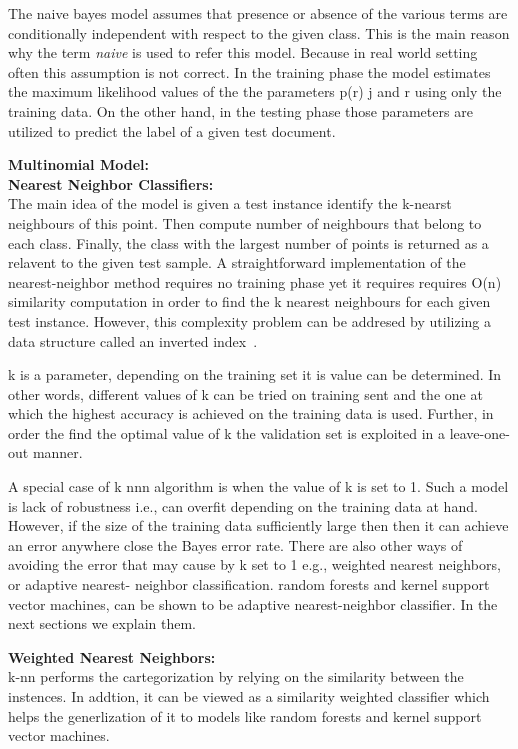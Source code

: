 The naive bayes model assumes that presence or absence of the various terms are conditionally independent with respect to the given class. This is the main reason why the term \textit{naive} is used to refer this model. Because in real world setting often this assumption is not correct. 
In the training phase the model estimates the maximum likelihood values of the the parameters p(r)
j and r using only the training data. On the other hand, in the testing phase those parameters are utilized to predict the label of a given test document. 

\textbf{Multinomial Model:}\\
\textbf{Nearest Neighbor Classifiers:}\\
The main idea of the model is given a test instance identify the k-nearst neighbours of this point. Then compute number of neighbours that belong to each class. Finally, the class with the largest number of points is returned as a relavent to the given test sample. A straightforward implementation of the nearest-neighbor method requires no training phase yet it requires requires O(n) similarity computation in order to find the k nearest neighbours for each given test instance. However, this complexity problem can be addresed by  utilizing a data structure called an inverted index~\cite{}.

k is a parameter, depending on the training set it is value can be determined. In other words, different values of k can be tried on training sent and the one at which the highest accuracy is achieved on the training data is used. Further, in order the find the optimal value of k the validation set is exploited in a leave-one-out manner.
 
A special case of k nnn algorithm is when the value of k is set to 1. Such a model is lack of robustness i.e., can overfit depending on the training data at hand. However, if the size of the training data sufficiently large then then it can achieve an error anywhere close the Bayes error rate. There are also other ways of avoiding the error that may cause by k set to 1 e.g., weighted nearest neighbors, or adaptive nearest- neighbor classification.  random forests and kernel support vector machines, can be shown to be adaptive nearest-neighbor classifier. In the next sections we explain them. 

\textbf{Weighted Nearest Neighbors:}\\
k-nn performs the cartegorization by relying on the similarity between the instences. In addtion, it can be viewed as a similarity weighted classifier which helps the generlization of it to models like random forests and kernel support vector machines.

